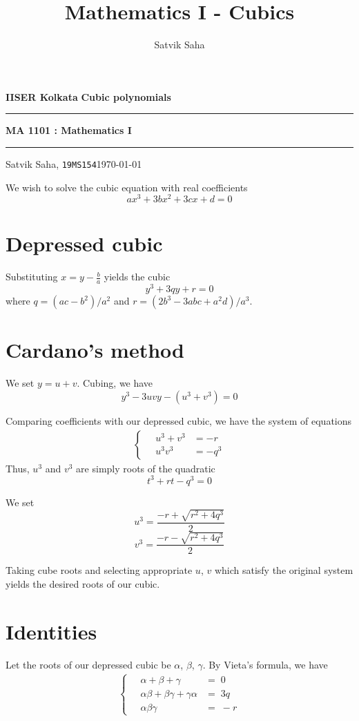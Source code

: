 \documentclass[10pt]{article}
\title{Mathematics I - Cubics}
\author{Satvik Saha}
\date{}
\begin{document}
        \par\textbf{IISER Kolkata} \hfill \textbf{Cubic polynomials}
        \vspace{3pt}
        \hrule
        \vspace{3pt}
        \begin{center}
                \LARGE{\textbf{MA 1101 : Mathematics I}}
        \end{center}
        \vspace{3pt}
        \hrule
        \vspace{3pt}
        Satvik Saha, \texttt{19MS154}\hfill\today
        \vspace{20pt}
        
        We wish to solve the cubic equation with real coefficients
        \[ax^3 + 3bx^2 + 3cx + d = 0\]
        \section{Depressed cubic}
        Substituting $x = y - \frac{b}{a}$ yields the cubic
        \[y^3 + 3qy + r = 0\]
        where $q = (ac - b^2)/a^2$ and $r = (2b^3 - 3abc + a^2d)/a^3$.
        \section{Cardano's method}
        We set $y = u + v$. Cubing, we have
        \[y^3 - 3uvy - (u^3 + v^3) = 0\]
        
        Comparing coefficients with our depressed cubic, we have the system of equations
        \begin{align*}
        \begin{cases}
                \quad u^3 + v^3 &= -r \\
                \quad u^3 v^3 &= -q^3
        \end{cases}
        \end{align*}
        Thus, $u^3$ and $v^3$ are simply roots of the quadratic
        \[t^3 + rt - q^3 = 0\]

        We set 
        \[ u^3 = \frac{-r + \sqrt{r^2 + 4q^3}}2 \]
        \[ v^3 = \frac{-r - \sqrt{r^2 + 4q^3}}2 \]
        
        Taking cube roots and selecting appropriate $u$, $v$ which satisfy the original system yields the desired roots of our cubic.

        \section{Identities}
        Let the roots of our depressed cubic be $\alpha$, $\beta$, $\gamma$. By Vieta's formula, we have
        \begin{align*}
        \begin{cases}
                \quad\alpha + \beta + \gamma &=\; 0 \\
                \quad\alpha\beta + \beta\gamma + \gamma\alpha &=\; 3q \\
                \quad\alpha\beta\gamma &=\; -r
        \end{cases}
        \end{align*}
\end{document}
